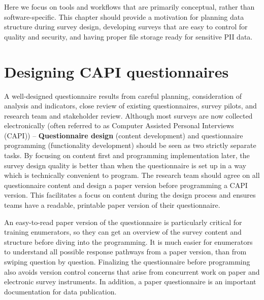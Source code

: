 
\begin{fullwidth}
	
	Here we focus on tools and workflows that are primarily conceptual, rather than software-specific. This chapter should provide a motivation for
	planning data structure during survey design,
	developing surveys that are easy to control for quality and security,
	and having proper file storage ready for sensitive PII data.
	

\end{fullwidth}


\section{Designing CAPI questionnaires}
A well-designed questionnaire results from careful planning, consideration of analysis and indicators, close review of existing questionnaires, survey pilots, and research team and stakeholder review. 
Although most surveys are now collected electronically (often referred to as Computer Assisted Personal Interviews (CAPI)) -- 
\textbf{Questionnaire design}
(content development) and questionnaire programming (functionality development) should be seen as two strictly separate tasks. By focusing on content first and programming implementation later, the survey design quality is better than when the questionnaire is set up in a way which is technically convenient to program. The research team should agree on all questionnaire content and design a paper version before programming a CAPI version. This facilitates a focus on content during the design process and ensures teams have a readable, printable paper version of their questionnaire.  

An easy-to-read paper version of the questionnaire is particularly critical for training enumerators, so they can get an overview of the survey content and structure before diving into the programming. It is much easier for enumerators to understand all possible response pathways from a paper version, than from swiping question by question. Finalizing the questionnaire before programming also avoids version control concerns that arise from concurrent work on paper and electronic survey instruments. In addition, a paper questionnaire is an important documentation for data publication. 

